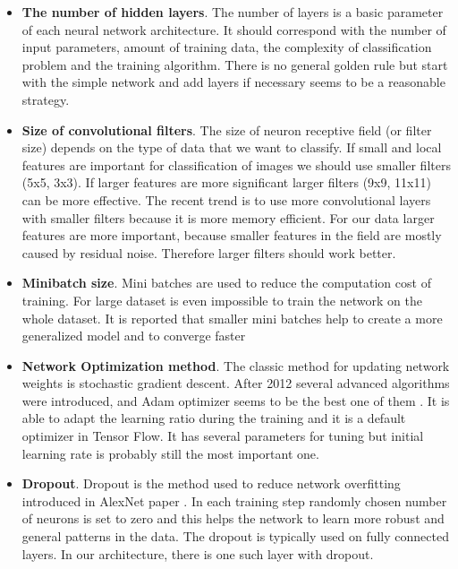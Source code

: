 \documentclass{article}
\begin{document}
\begin{itemize}
\item
  \textbf{The number of hidden layers}. The number of layers is a basic
  parameter of each neural network architecture. It should correspond
  with the number of input parameters, amount of training data, the
  complexity of classification problem and the training algorithm. There
  is no general golden rule but start with the simple network and add
  layers if necessary seems to be a reasonable strategy.
  
\item
  \textbf{Size of convolutional filters}. The size of neuron receptive
  field (or filter size) depends on the type of data that we want to
  classify. If small and local features are important for classification
  of images we should use smaller filters (5x5, 3x3). If larger features
  are more significant larger filters (9x9, 11x11) can be more
  effective. The recent trend is to use more convolutional layers with
  smaller filters because it is more memory efficient. For our data
  larger features are more important, because smaller features in the
  field are mostly caused by residual noise. Therefore larger filters
  should work better.
\item
  \textbf{Minibatch size}. Mini batches are used to reduce the
  computation cost of training. For large dataset is even impossible to
  train the network on the whole dataset. It is reported that smaller
  mini batches help to create a more generalized model and to converge
  faster \cite{minibatch}
\item
  \textbf{Network Optimization method}. The classic method for updating
  network weights is stochastic gradient descent. After 2012 several
  advanced algorithms were introduced, and Adam optimizer
  \cite{adam} seems to be the best one of
  them \cite{gradient-comparsion}. It is able to adapt
  the learning ratio during the training and it is a default optimizer
  in Tensor Flow. It has several parameters for tuning but initial
  learning rate is probably still the most important one.
\item
  \textbf{Dropout}. Dropout is the method used to reduce network
  overfitting introduced in AlexNet paper
  \cite{alexnet}.
  In each training step randomly chosen number of neurons is set to zero
  and this helps the network to learn more robust and general patterns
  in the data. The dropout is typically used on fully connected layers.
  In our architecture, there is one such layer with dropout.
\end{itemize}
\end{document}
